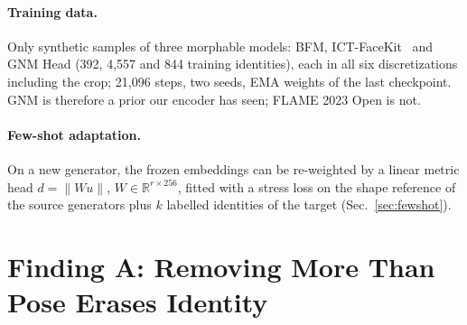 \documentclass[10pt,twocolumn,letterpaper]{article}
\begin{document}
\paragraph{Training data.} Only synthetic samples of three morphable models: BFM, ICT-FaceKit~\cite{ict-facekit} and GNM Head (392, 4{,}557 and 844 training identities), each in all six discretizations including the crop; 21{,}096 steps, two seeds, EMA weights of the last checkpoint. GNM is therefore a prior our encoder has seen; FLAME 2023 Open is not.

\paragraph{Few-shot adaptation.} On a new generator, the frozen embeddings can be re-weighted by a linear metric head $d=\|W u\|$, $W\in\mathbb R^{r\times 256}$, fitted with a stress loss on the shape reference of the source generators plus $k$ labelled identities of the target (Sec.~\ref{sec:fewshot}).

\section{Finding A: Removing More Than Pose Erases Identity}
\label{sec:alignment}

\begin{table}[t]
  \centering
  \scriptsize
  \caption{\textbf{Alignment scale.} Spearman correlation with the form reference (FR), cross-discretization pairs without crop, point estimates (95\% intervals in Supp.~\ref{S-sec:scale}). $\Delta$: paired difference against rigid ICP in millimetres on HIFI3D (unified matrix, pending). $^\dagger$Different row set (all 99{,}000 rows, no common mask).}
  \label{tab:scale}
  \setlength{\tabcolsep}{3pt}
  \resizebox{\linewidth}{!}{}
\end{table}
\end{document}
